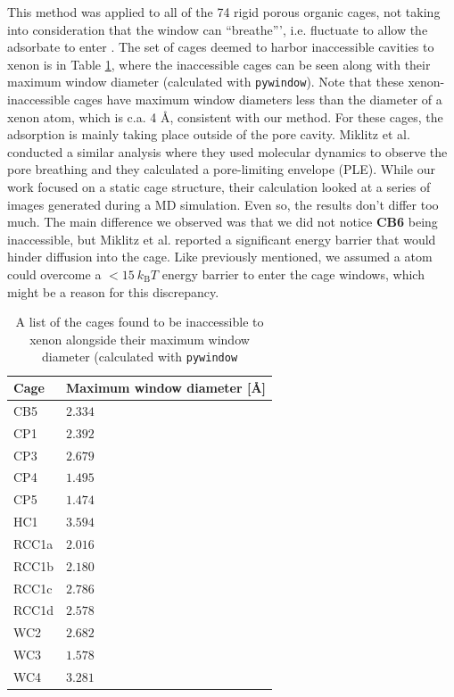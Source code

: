 \documentclass[journal=jacsat,manuscript=article]{achemso}
\begin{document}
{This method was applied to all of the 74 rigid porous organic cages, not taking into consideration that the window can ``breathe''', i.e. fluctuate to allow the adsorbate to enter \cite{miklitz2017computational}. The set of cages deemed to harbor inaccessible cavities to xenon is in Table \ref{tbl:inaccessible}, where the inaccessible cages can be seen along with their maximum window diameter (calculated with \texttt{pywindow}). Note that these xenon-inaccessible cages have maximum window diameters less than the diameter of a xenon atom, which is c.a. 4 \AA, consistent with our method. For these cages, the adsorption is mainly taking place outside of the pore cavity. Miklitz et al.\cite{miklitz2017computational} conducted a similar analysis where they used molecular dynamics to observe the pore breathing and they calculated a pore-limiting envelope (PLE). While our work focused on a static cage structure, their calculation looked at a series of images generated during a MD simulation. Even so, the results don't differ too much.  The main difference we observed was that we did not notice \textbf{CB6} being inaccessible, but Miklitz et al. reported a significant energy barrier that would hinder diffusion into the cage. Like previously mentioned, we assumed a  atom could overcome a $<15 \ k_\text{B}T$ energy barrier to enter the cage windows, which might be a reason for this discrepancy.

\begin{table}
  \caption{\color{red}A list of the cages found to be inaccessible to xenon alongside their maximum window diameter (calculated with \texttt{pywindow}}
  \label{tbl:inaccessible}
  \begin{tabular}{lp{3.5cm}}
    \hline
    \textbf{Cage}  & \textbf{Maximum window diameter [\AA]}  \\
    \hline
    CB5 & $2.334$ \\
    CP1 & $2.392$ \\
    CP3 & $2.679$ \\
    CP4 & $1.495$ \\
	CP5 & $1.474$ \\
    HC1 & $3.594$ \\
    RCC1a & $2.016$ \\
    RCC1b & $2.180$ \\
    RCC1c & $2.786$ \\
	RCC1d & $2.578$ \\
	WC2 & $2.682$ \\
	WC3 & $1.578$ \\
	WC4 & $3.281$ \\
    \hline
  \end{tabular}
\end{table}

}
\end{document}
